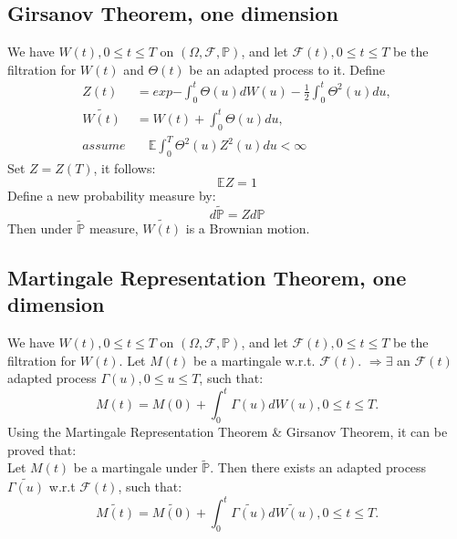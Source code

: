 \documentclass[a4paper, 11pt]{article}
\begin{document}
\subsection{Girsanov Theorem, one dimension}
We have $W(t), 0\leq t \leq T$ on $(\Omega, \mathcal{F}, \mathbb{P})$, and let $\mathcal{F}(t), 0 \leq t \leq T$ be the filtration for $W(t)$ and $\Theta(t)$ be an adapted process to it. Define
\begin{subequations}
\begin{align}
Z(t) &= exp{-\int_0^t\Theta(u)dW(u) - \frac{1}{2}\int_0^t\Theta^2(u) du}, \\
\widetilde{W(t)} &= W(t) + \int_0^t\Theta(u)du, \\
assume &\quad \mathbb{E}\int_0^T \Theta^2(u)Z^2(u)du < \infty
\end{align}
\end{subequations}
Set $Z = Z(T)$, it follows:
\begin{equation}
\mathbb{E}Z = 1 
\end{equation}
Define  a new probability measure by:
\begin{equation}
d\widetilde{\mathbb{P}} = Zd\mathbb{P}
\end{equation}
Then under $\widetilde{\mathbb{P}}$ measure, $\widetilde{W(t)}$ is a Brownian motion.

\subsection{Martingale Representation Theorem, one dimension}
We have $W(t), 0\leq t \leq T$ on $(\Omega, \mathcal{F}, \mathbb{P})$, and let $\mathcal{F}(t), 0 \leq t \leq T$ be the filtration for $W(t)$. Let $M(t)$ be a martingale w.r.t. $\mathcal{F}(t)$. 
$\Longrightarrow \exists$ an $\mathcal{F}(t)$ adapted process $\Gamma(u), 0 \leq u \leq T$, such that:
\begin{equation}
M(t) = M(0) + \int_0^t \Gamma(u)dW(u), 0 \leq t \leq T.
\end{equation}
\indent Using the Martingale Representation Theorem \& Girsanov Theorem, it can be proved that: \\
\indent Let $M(t)$ be a martingale under $\widetilde{\mathbb{P}}$. Then there exists an adapted process $\widetilde{\Gamma(u)}$ w.r.t $\mathcal{F}(t)$, such that:
\begin{equation}
\widetilde{M(t)} = \widetilde{M(0)} + \int_0^t \widetilde{\Gamma(u)} \widetilde{dW(u)}, 0 \leq t \leq T.
\end{equation}
\end{document}
